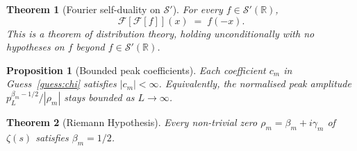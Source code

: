 \documentclass[10pt,a4paper]{amsart}
\newtheorem{theorem}{Theorem}
\newtheorem{proposition}{Proposition}
\begin{document}
\begin{theorem}[Fourier self-duality on $\mathcal{S}'$]
\label{thm:selfdual}
For every $f \in \mathcal{S}'(\mathbb{R})$,
\begin{equation}
  \mathcal{F}\!\left[\mathcal{F}[f]\right](x)
   \;=\; f(-x).
  \label{eq:selfdual}
\end{equation}
This is a theorem of distribution theory, holding unconditionally
with no hypotheses on $f$ beyond
$f \in \mathcal{S}'(\mathbb{R})$.
\end{theorem}

\begin{proposition}[Bounded peak coefficients]
\label{prop:bounded}
Each coefficient $c_m$ in Guess~\ref{guess:chi} satisfies
$|c_m| < \infty$. Equivalently, the normalised peak amplitude
$p_L^{\beta_m - 1/2}/|\rho_m|$ stays bounded as
$L \to \infty$.
\end{proposition}

\begin{theorem}[Riemann Hypothesis]
\label{thm:RH}
Every non-trivial zero $\rho_m = \beta_m + i\gamma_m$ of
$\zeta(s)$ satisfies $\beta_m = 1/2$.
\end{theorem}
\end{document}
